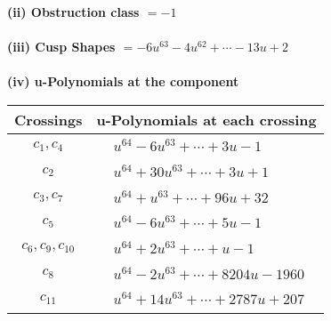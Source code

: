 \documentclass[1p]{elsarticle_modified}
\theoremstyle{definition}
\begin{document}
\flushleft \textbf{(ii) Obstruction class $= -1$}\\~\\
\flushleft \textbf{(iii) Cusp Shapes $= -6 u^{63}-4 u^{62}+\cdots-13 u+2$}\\~\\
\newpage\renewcommand{\arraystretch}{1}
\flushleft \textbf{(iv) u-Polynomials at the component}\newline \\
\begin{tabular}{m{50pt}|m{274pt}}
Crossings & \hspace{64pt}u-Polynomials at each crossing \\
\hline $$\begin{aligned}c_{1},c_{4}\end{aligned}$$&$\begin{aligned}
&u^{64}-6 u^{63}+\cdots+3 u-1
\end{aligned}$\\
\hline $$\begin{aligned}c_{2}\end{aligned}$$&$\begin{aligned}
&u^{64}+30 u^{63}+\cdots+3 u+1
\end{aligned}$\\
\hline $$\begin{aligned}c_{3},c_{7}\end{aligned}$$&$\begin{aligned}
&u^{64}+u^{63}+\cdots+96 u+32
\end{aligned}$\\
\hline $$\begin{aligned}c_{5}\end{aligned}$$&$\begin{aligned}
&u^{64}-6 u^{63}+\cdots+5 u-1
\end{aligned}$\\
\hline $$\begin{aligned}c_{6},c_{9},c_{10}\end{aligned}$$&$\begin{aligned}
&u^{64}+2 u^{63}+\cdots+u-1
\end{aligned}$\\
\hline $$\begin{aligned}c_{8}\end{aligned}$$&$\begin{aligned}
&u^{64}-2 u^{63}+\cdots+8204 u-1960
\end{aligned}$\\
\hline $$\begin{aligned}c_{11}\end{aligned}$$&$\begin{aligned}
&u^{64}+14 u^{63}+\cdots+2787 u+207
\end{aligned}$\\
\hline
\end{tabular}\\~\\
\end{document}

